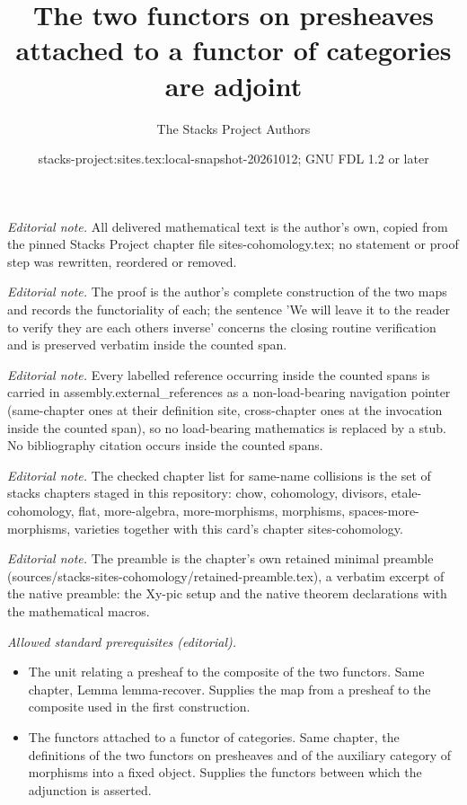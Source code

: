 \documentclass[10pt,a4paper]{amsart}
\title{The two functors on presheaves attached to a functor of categories are adjoint}
\author{The Stacks Project Authors}
\date{stacks-project:sites.tex:local-snapshot-20261012; GNU FDL 1.2 or later}
\theoremstyle{plain}
\theoremstyle{definition}
\theoremstyle{remark}
\numberwithin{equation}{subsection}
\begin{document}
\maketitle
\noindent\textit{Editorial note.} All delivered mathematical text is the author's own, copied from the pinned Stacks Project chapter file sites-cohomology.tex; no statement or proof step was rewritten, reordered or removed.\par\medskip
\noindent\textit{Editorial note.} The proof is the author's complete construction of the two maps and records the functoriality of each; the sentence 'We will leave it to the reader to verify they are each others inverse' concerns the closing routine verification and is preserved verbatim inside the counted span.\par\medskip
\noindent\textit{Editorial note.} Every labelled reference occurring inside the counted spans is carried in assembly.external\_references as a non-load-bearing navigation pointer (same-chapter ones at their definition site, cross-chapter ones at the invocation inside the counted span), so no load-bearing mathematics is replaced by a stub. No bibliography citation occurs inside the counted spans.\par\medskip
\noindent\textit{Editorial note.} The checked chapter list for same-name collisions is the set of stacks chapters staged in this repository: chow, cohomology, divisors, etale-cohomology, flat, more-algebra, more-morphisms, morphisms, spaces-more-morphisms, varieties together with this card's chapter sites-cohomology.\par\medskip
\noindent\textit{Editorial note.} The preamble is the chapter's own retained minimal preamble (sources/stacks-sites-cohomology/retained-preamble.tex), a verbatim excerpt of the native preamble: the Xy-pic setup and the native theorem declarations with the mathematical macros.\par\medskip
\noindent\textit{Allowed standard prerequisites (editorial).}\begin{itemize}
\item The unit relating a presheaf to the composite of the two functors. Same chapter, Lemma lemma-recover. Supplies the map from a presheaf to the composite used in the first construction.
\item The functors attached to a functor of categories. Same chapter, the definitions of the two functors on presheaves and of the auxiliary category of morphisms into a fixed object. Supplies the functors between which the adjunction is asserted.
\end{itemize}\medskip
\end{document}
